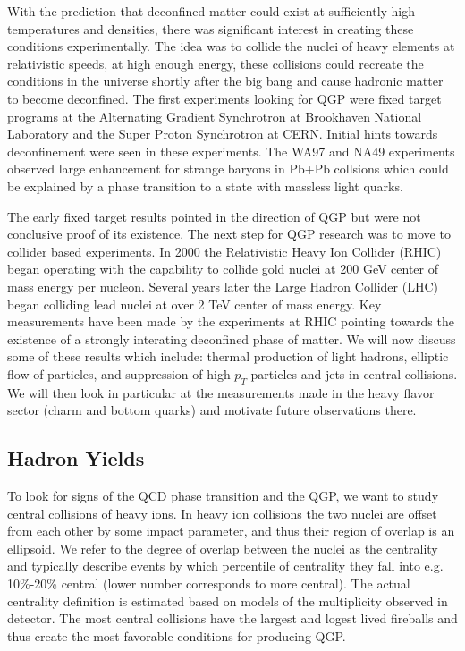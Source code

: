 With the prediction that deconfined matter could exist at sufficiently high temperatures and densities, there was significant interest in creating these conditions experimentally. The idea was to collide the nuclei of heavy elements at relativistic speeds, at high enough energy, these collisions could recreate the conditions in the universe shortly after the big bang and cause hadronic matter to become deconfined. The first experiments looking for QGP were fixed target programs at the Alternating Gradient Synchrotron at Brookhaven National Laboratory and the Super Proton Synchrotron at CERN. Initial hints towards deconfinement were seen in these experiments. The WA97 and NA49 experiments observed large enhancement for strange baryons in Pb+Pb collsions which could be explained by a phase transition to a state with massless light quarks.

The early fixed target results pointed in the direction of QGP but were not conclusive proof of its existence. The next step for QGP research was to move to collider based experiments. In 2000 the Relativistic Heavy Ion Collider (RHIC) began operating with the capability to collide gold nuclei at 200 GeV center of mass energy per nucleon. Several years later the Large Hadron Collider (LHC) began colliding lead nuclei at over 2 TeV center of mass energy. Key measurements have been made by the experiments at RHIC pointing towards the existence of a strongly interating deconfined phase of matter. We will now discuss some of these results which include: thermal production of light hadrons, elliptic flow of particles, and suppression of high $p_T$ particles and jets in central collisions. We will then look in particular at the measurements made in the heavy flavor sector (charm and bottom quarks) and motivate future observations there.

\subsection{Hadron Yields}

To look for signs of the QCD phase transition and the QGP, we want to study central collisions of heavy ions. In heavy ion collisions the two nuclei are offset from each other by some impact parameter, and thus their region of overlap is an ellipsoid. We refer to the degree of overlap between the nuclei as the centrality and typically describe events by which percentile of centrality they fall into e.g. 10\%-20\% central (lower number corresponds to more central). The actual centrality definition is estimated based on models of the multiplicity observed in detector. The most central collisions have the largest and logest lived fireballs and thus create the most favorable conditions for producing QGP. 

